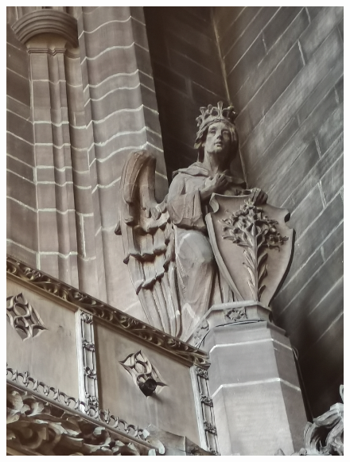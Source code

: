 \documentclass[11pt]{article}
\begin{document}
\begin{figure}[H]
    \centering
    \includegraphics[width=\textwidth]{1N.jpg}
\end{figure}
\end{document}
